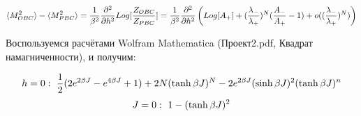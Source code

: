 \begin{equation}\label{eq:diffSqMagnER1}
    \langle M^{2}_{OBC} \rangle - \langle M^{2}_{PBC} \rangle = \frac{1}{\beta^{2}} \frac{\partial^{2}}{\partial h^{2}} Log[\frac{Z_{OBC}}{Z_{PBC}}] = \frac{1}{\beta^{2}} \frac{\partial^{2}}{\partial h^{2}} \left(Log[A_{+}]+(\frac{\lambda_{-}}{\lambda_{+}})^{N}(\frac{A_{-}}{A_{+}} - 1) + o((\frac{\lambda_{-}}{\lambda_{+}})^{N})\right)  
\end{equation}

Воспользуемся расчётами Wolfram Mathematica (Проект2.pdf, Квадрат намагниченности), и получим: 

\[ h = 0:\ \frac{1}{2}(2e^{2\bj}-e^{4\bj}+1)+2N(\tanh{\bj})^{N}-2e^{2\bj}(\sinh{\bj})^{2}(\tanh{\bj})^{n}\]
\[ J = 0:\ 1-(\tanh{\beta J})^{2}\]
